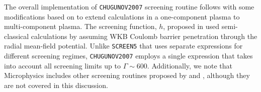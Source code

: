 \documentclass[preprint,times,tighten,linenumbers]{aastex631}
\newcommand{\microphysics}{{\sf Microphysics}}
\begin{document}
The overall implementation of {\tt CHUGUNOV2007} screening routine follows \cite{Chugunov_2007} with some modifications based on \cite{Yakovlev_2006} to extend calculations in a one-component plasma to multi-component plasma. The screening function, $h$, proposed in \cite{Chugunov_2007} used semi-classical calculations by assuming WKB Coulomb barrier penetration through the radial mean-field potential. Unlike {\tt SCREEN5} that uses separate expressions for different screening regimes, {\tt CHUGUNOV2007} employs a single expression that takes into account all screening limits up to $\Gamma \sim 600$. Additionally, we note that {\microphysics} includes other screening routines proposed by \cite{Chugunov_2009} and \cite{Chabrier:1998, Calder:2007}, although they are not covered in this discussion.




\end{document}
